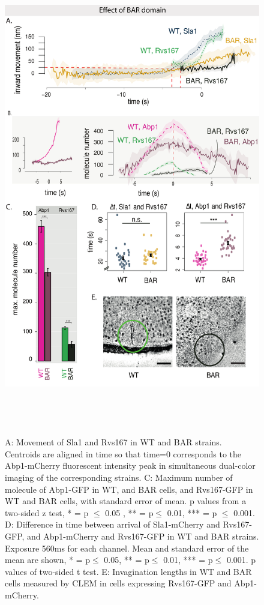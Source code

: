 \begin{figure}
	\centering
	\includegraphics[width=21cm,height=21cm,keepaspectratio]{figures/results_final/delsh3_9}
	\caption [Effect of the Rvs167 SH3 deletion]
	{A: Movement of Sla1 and Rvs167 in WT and BAR strains. Centroids are aligned in time so that time=0 corresponds to the Abp1-mCherry fluorescent intensity peak in simultaneous dual-color imaging of the corresponding strains. 
	C: Maximum number of molecule of Abp1-GFP in WT, and BAR cells, and Rvs167-GFP in WT and BAR cells, with standard error of mean. p values from a two-sided z test, * = p $\leq$ 0.05 , ** = p$\leq$ 0.01, *** = p $\leq$ 0.001. 
	D: Difference in time between arrival of Sla1-mCherry and Rvs167-GFP, and Abp1-mCherry and Rvs167-GFP in WT and BAR strains. Exposure 560ms for each channel. Mean and standard error of the mean are shown, * = p$\leq$ 0.05, ** = p$\leq$ 0.01, *** = p$\leq$ 0.001. p values of two-sided t test.
	E: Invagination lengths in WT and BAR cells measured by CLEM in cells expressing Rvs167-GFP and Abp1-mCherry. 
	\label{fig2_sh3del}}

	\end{figure}
	\vspace{5mm}
	
